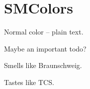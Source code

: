 \documentclass[class=scrartcl,crop=false]{standalone}
\begin{document}
\section{SMColors}

Normal color -- plain text.


\textcolor{feuervogel}{Maybe an important todo?}

\textcolor{tubsred}{Smells like Braunschweig.}

\textcolor{tcsdarkblue}{Tastes like TCS.}
\end{document}
